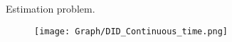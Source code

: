 \documentclass[9pt]{beamer}
\begin{document}


 
 

\begin{frame}{Estimation problem.}
        \begin{figure}[H]
    \centering
        \renewcommand\thefigure{4.2}
    \texttt{[image: Graph/DID\_‎Continuous\_time.png]}  
     
\end{figure}
\end{frame}
\end{document}
